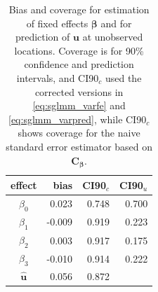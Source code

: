 \documentclass[12pt, titlepage]{article}
\begin{document}
\begin{table}[H] 
	\caption{Bias and coverage for estimation of fixed effects $\boldsymbol{\beta}$ and for prediction of $\mathbf{u}$ at unobserved locations.  Coverage is for 90\% confidence and prediction intervals, and CI90$_{c}$ used the corrected versions in \eqref{eq:sglmm_varfe} and \eqref{eq:sglmm_varpred}, while CI90$_{c}$ shows coverage for the naive standard error estimator based on $\mathbf{C}_{\boldsymbol{\beta}}$.  \label{tab:sglm_fe}}
\begin{center}
\begin{tabular}{|c|rrr|}
\hline
\hline
effect & bias & CI90$_{c}$ & CI90$_{u}$ \\
\hline
$\beta_{0}$ &  0.023 & 0.748 & 0.700 \\ 
$\beta_{1}$ &   -0.009 & 0.919 & 0.223 \\ 
$\beta_{2}$ &  0.003 & 0.917 & 0.175 \\ 
$\beta_{3}$ &  -0.010 & 0.914 & 0.222 \\ 
$\hat{\mathbf{u}}$ &  0.056 & 0.872 &  \\ 
\hline
\hline
\end{tabular}
\end{center}
\end{table}



%


%
%
\end{document}
